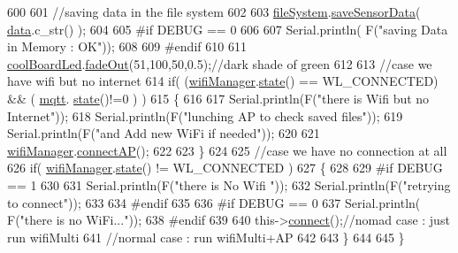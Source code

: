 \begin{DoxyCode}
600     
601     \textcolor{comment}{//saving data in the file system}
602     
603     \hyperlink{class_cool_board_a42c2586fbb13ff7f06538e9284e8538d}{fileSystem}.\hyperlink{class_cool_file_system_afa3a4feae94871d4d3b6bebb701c2e67}{saveSensorData}( \hyperlink{class_cool_board_a427fb753dd8575bdf821c70a5c63d695}{data}.c\_str() );
604 
605 \textcolor{preprocessor}{    #if DEBUG == 0}
606 
607         Serial.println( F(\textcolor{stringliteral}{"saving Data in Memory : OK"}));
608 
609 \textcolor{preprocessor}{    #endif}
610 
611     \hyperlink{class_cool_board_a1b1d3c684a5baa56b08486e192fd8e97}{coolBoardLed}.\hyperlink{class_cool_board_led_a93d545679237e8cc858324367149775c}{fadeOut}(51,100,50,0.5);\textcolor{comment}{//dark shade of green}
612 
613     \textcolor{comment}{//case we have wifi but no internet}
614     \textcolor{keywordflow}{if}( (\hyperlink{class_cool_board_acd88e6003606b47479ebba81e4aceeca}{wifiManager}.\hyperlink{class_cool_wifi_a1c7b4d82a4098d346e7593dce92039fa}{state}() == WL\_CONNECTED) && ( \hyperlink{class_cool_board_a2399f44d7c23c1149a335cb3b46d90f1}{mqtt}.
      \hyperlink{class_cool_m_q_t_t_a5d003307eff78efbd585e42b43b72b6d}{state}()!=0 ) )
615     \{
616         
617         Serial.println(F(\textcolor{stringliteral}{"there is Wifi but no Internet"}));
618         Serial.println(F(\textcolor{stringliteral}{"lunching AP to check saved files"}));
619         Serial.println(F(\textcolor{stringliteral}{"and Add new WiFi if needed"}));
620         
621         \hyperlink{class_cool_board_acd88e6003606b47479ebba81e4aceeca}{wifiManager}.\hyperlink{class_cool_wifi_a7c857f27161782f5ef1d62d552aff971}{connectAP}();
622         
623     \}
624     
625     \textcolor{comment}{//case we have no connection at all}
626     \textcolor{keywordflow}{if}( \hyperlink{class_cool_board_acd88e6003606b47479ebba81e4aceeca}{wifiManager}.\hyperlink{class_cool_wifi_a1c7b4d82a4098d346e7593dce92039fa}{state}() != WL\_CONNECTED )
627     \{
628     
629 \textcolor{preprocessor}{    #if DEBUG == 1}
630         
631         Serial.println(F(\textcolor{stringliteral}{"there is No Wifi "}));
632         Serial.println(F(\textcolor{stringliteral}{"retrying to connect"}));
633     
634 \textcolor{preprocessor}{    #endif}
635 
636 \textcolor{preprocessor}{    #if DEBUG == 0}
637         Serial.println( F(\textcolor{stringliteral}{"there is no WiFi..."}));
638 \textcolor{preprocessor}{    #endif}
639         
640         this->\hyperlink{class_cool_board_a519de78b807f8ec6463ff484eb925918}{connect}();\textcolor{comment}{//nomad case : just run wifiMulti}
641                 \textcolor{comment}{//normal case : run wifiMulti+AP}
642         
643     \}   
644 
645 \}
\end{DoxyCode}

